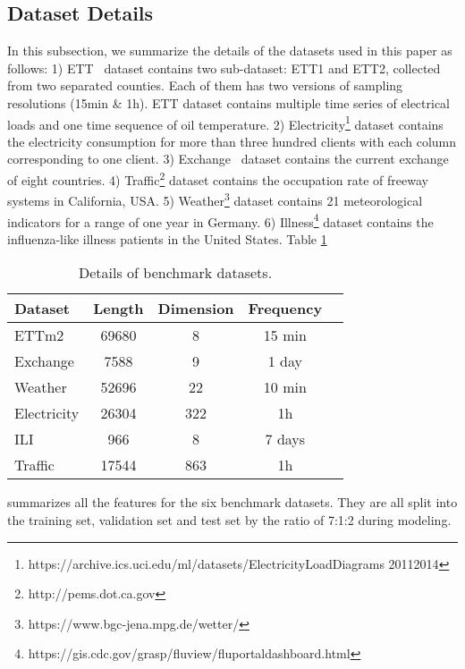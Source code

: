 \documentclass{article}
\begin{document}
\subsection{Dataset Details}
\label{app:dataset}
In this subsection, we summarize the details of the datasets used in this paper as follows: 1) ETT~\cite{haoyietal-informer-2021} dataset contains two sub-dataset: ETT1 and ETT2, collected from two separated counties. Each of them has two versions of sampling resolutions (15min \& 1h). ETT dataset contains multiple time series of electrical loads and one time sequence of oil temperature. 2) Electricity\footnote{https://archive.ics.uci.edu/ml/datasets/ElectricityLoadDiagrams 20112014} dataset contains the electricity consumption for more than three hundred clients with each column corresponding to one client. 3) Exchange~\cite{lai2018modeling-exchange-dataset} dataset contains the current exchange of eight countries. 4) Traffic\footnote{http://pems.dot.ca.gov} dataset contains the occupation rate of freeway systems in California, USA. 5) Weather\footnote{https://www.bgc-jena.mpg.de/wetter/} dataset contains 21 meteorological indicators for a range of one year in Germany. 6) Illness\footnote{https://gis.cdc.gov/grasp/fluview/fluportaldashboard.html} dataset contains the influenza-like illness patients in the United States. Table \ref{tab:dataset} 
\begin{table}[t]
\caption{Details of benchmark datasets.}
\label{tab:dataset}
\vskip 0.15in
\begin{center}
\begin{small}
\begin{sc}
\begin{tabular}{l|cccr}
\toprule
Dataset & Length & Dimension & Frequency \\
\midrule
ETTm2 & 69680 & 8 & 15 min\\
Exchange & 7588 & 9 & 1 day\\
Weather & 52696 & 22 & 10 min & \\
Electricity & 26304 & 322 & 1h & \\
ILI & 966 & 8 & 7 days\\
Traffic & 17544 & 863 & 1h & \\
\bottomrule
\end{tabular}
\end{sc}
\end{small}
\end{center}
\vskip -0.1in
\end{table} summarizes all the features for the six benchmark datasets. They are all split into the training set, validation set and test set by the ratio of 7:1:2 during modeling. 
\end{document}
